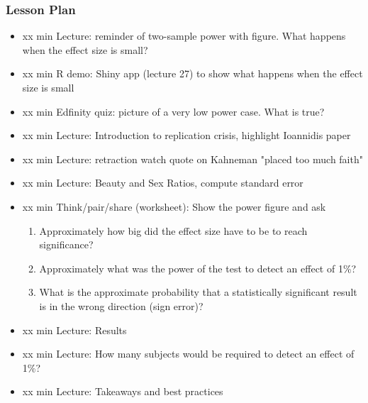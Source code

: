\begin{frame}
    \frametitle{Lesson Plan}
    \begin{itemize}
        \item xx min Lecture: reminder of two-sample power with figure. What happens when the effect size is small?
        \item xx min R demo: Shiny app (lecture 27) to show what happens when the effect size is small
        \item xx min Edfinity quiz: picture of a very low power case. What is true? 
        \item xx min Lecture: Introduction to replication crisis, highlight Ioannidis paper
        \item xx min Lecture: retraction watch quote on Kahneman "placed too much faith"
        \item xx min Lecture: Beauty and Sex Ratios, compute standard error
        \item xx min Think/pair/share (worksheet): Show the power figure and ask
        \begin{enumerate}
            \item Approximately how big did the effect size have to be to reach significance?
            \item Approximately what was the power of the test to detect an effect of 1\%?
            \item What is the approximate probability that a statistically significant result is in the wrong direction (sign error)?
        \end{enumerate}
        \item xx min Lecture: Results
        \item xx min Lecture: How many subjects would be required to detect an effect of 1\%? 
        \item xx min Lecture: Takeaways and best practices
    \end{itemize}
\end{frame}

    

